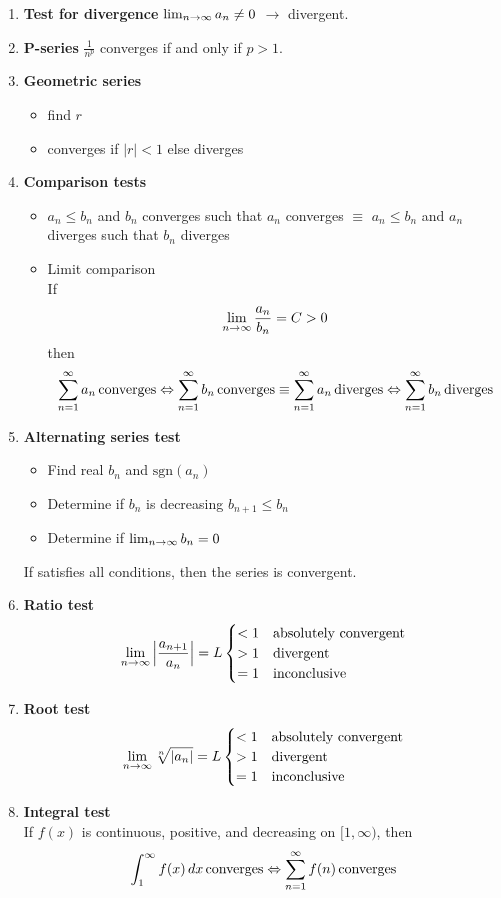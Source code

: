 \begin{enumerate}
  \item \textbf{Test for divergence} \(\lim_{n \to \infty} a_{n} \neq 0\) \(\to\) divergent.
  \item \textbf{P-series} \(\frac{1}{n^p}\) converges if and only if \(p > 1\).
  \item \textbf{Geometric series} 
    \begin{itemize}
      \item find \(r\)
      \item converges if \(|r| < 1\) else diverges
    \end{itemize}
  \item \textbf{Comparison tests}
    \begin{itemize}
      \item \(a_n \le b_n\) and \(b_n\) converges such that \(a_n\) converges \(\equiv\) \(a_n \le b_n\) and \(a_n\) diverges such that \(b_n\) diverges
      \item Limit comparison \\
      If
      \[
        \lim_{n \to \infty} \frac{a_n}{b_n} = C > 0
      \]
      then
      \[
        \sum_{n=1}^{\infty} a_n \, \mathrm{converges} \Leftrightarrow \sum_{n=1}^{\infty} b_n \, \mathrm{converges} \equiv \sum_{n=1}^{\infty} a_n \, \mathrm{diverges} \Leftrightarrow \sum_{n=1}^{\infty} b_n \, \mathrm{diverges}
      \]
    \end{itemize}
  \item \textbf{Alternating series test}
    \begin{itemize}
      \item Find real \(b_n\) and \(\mathrm{sgn}{(a_n)}\)
      \item Determine if \(b_n\) is decreasing \(b_{n + 1} \le b_{n}\)
      \item Determine if \(\lim_{n \to \infty} b_n = 0\)
    \end{itemize}
    If satisfies all conditions, then the series is convergent.
  \item \textbf{Ratio test}
    \[
      \lim_{n \to \infty} \Big| \frac{a_{n+1}}{a_n} \Big| = L \begin{cases}
        < 1 & \text{absolutely convergent} \\
        > 1 & \text{divergent} \\
        = 1 & \text{inconclusive}
      \end{cases}
    \]
  \item \textbf{Root test}
    \[
      \lim_{n \to \infty} \sqrt[n]{|a_n|} = L \begin{cases}
        < 1 & \text{absolutely convergent} \\
        > 1 & \text{divergent} \\
        = 1 & \text{inconclusive}
      \end{cases}
    \]
  \item \textbf{Integral test} \\
  If \(f(x)\) is continuous, positive, and decreasing on \([1, \infty)\), then
  \[
    \int_{1}^{\infty} f(x) \, dx \, \mathrm{converges} \Leftrightarrow \sum_{n=1}^{\infty} f(n) \, \mathrm{converges}
  \]
\end{enumerate}